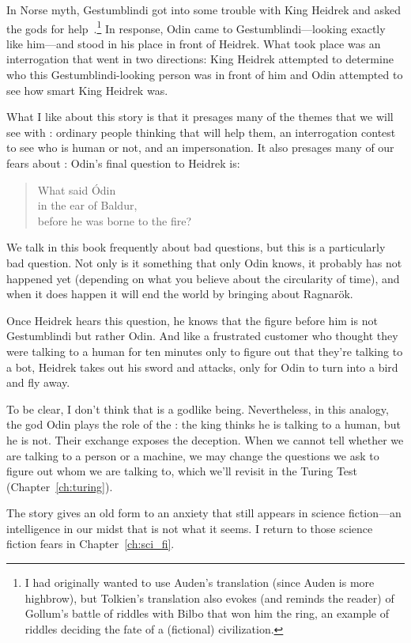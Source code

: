In Norse myth, Gestumblindi got into some trouble with King Heidrek and asked the gods
for help~\citep{Tolkien1960Saga}.\footnote{I had originally wanted to use Auden's
translation (since Auden is more highbrow), but Tolkien's translation also evokes
(and reminds the reader) of Gollum's battle of riddles with Bilbo that won him the
ring, an example of riddles deciding the fate of a (fictional) civilization.}
%
In response, Odin came to Gestumblindi---looking exactly like him---and stood in his
place in front of Heidrek.
%
What took place was an interrogation that went in two directions: King Heidrek attempted
to determine who this Gestumblindi-looking person was in front of him and Odin attempted
to see how smart King Heidrek was.

What I like about this story is that it presages many of the themes that we will see
with : ordinary people thinking that  will help them, an interrogation
contest to see who is human or not, and an impersonation.
%
It also presages many of our fears about : Odin's final question to Heidrek is:
\begin{quote}
What said \'Odin \\
in the ear of Baldur, \\
before he was borne to the fire?
\end{quote}
We talk in this book frequently about bad questions, but this is a particularly bad question.
%
Not only is it something that only Odin knows, it probably has not happened yet
(depending on what you believe about the circularity of time), and when it does
happen it will end the world by bringing about Ragnar\"ok.

Once Heidrek hears this question, he knows that the figure before him is not Gestumblindi
but rather Odin.
%
And like a frustrated customer who thought they were talking to a human for ten
minutes only to figure out that they're talking to a bot, Heidrek takes out his
sword and attacks, only for Odin to turn into a bird and fly away.

To be clear, I don't think that  is a godlike being.  Nevertheless, in this
analogy, the god Odin plays the role of the : the king thinks he is
talking to a human, but he is not.  Their exchange exposes the deception.
%
When we cannot tell whether we are talking to a person or a machine, 
we may change the questions we ask to figure out whom we are talking
to, which we'll revisit in the Turing Test (Chapter~\ref{ch:turing}).

The story gives an old form to an anxiety that
still appears in science fiction---an intelligence in our midst that
 is not what it seems.  I return to those science fiction fears in
Chapter~\ref{ch:sci_fi}.

